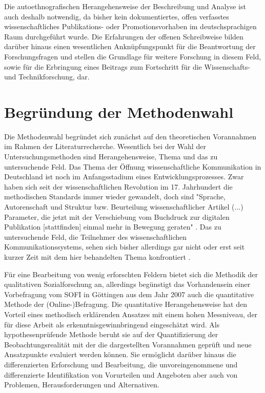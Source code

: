 Die autoethnografischen Herangehensweise der Beschreibung und Analyse ist auch deshalb notwendig, da bisher kein dokumentiertes, offen verfasstes wissenschaftliches Publikations- oder Promotionsvorhaben im deutschsprachigen Raum durchgeführt wurde. Die Erfahrungen der offenen Schreibweise bilden darüber hinaus einen wesentlichen Anknüpfungspunkt für die Beantwortung der Forschungsfragen und stellen die Grundlage für weitere Forschung in diesem Feld, sowie für die Erbringung eines Beitrags zum Fortschritt für die Wissenschafts- und Technikforschung, dar.

\section{Begründung der Methodenwahl}

Die Methodenwahl begründet sich zunächst auf den theoretischen Vorannahmen im Rahmen der Literaturrecherche. Wesentlich bei der Wahl der Untersuchungsmethoden sind Herangehensweise, Thema und das zu untersuchende Feld. Das Thema der Öffnung wissenschaftliche Kommunikation in Deutschland ist noch im Anfangsstadium eines Entwicklungsprozesses. Zwar haben sich seit der wissenschaftlichen Revolution im 17. Jahrhundert die methodischen Standards immer wieder gewandelt, doch sind "Sprache, Autorenschaft und Struktur bzw. Beurteilung wissenschaftlicher Artikel (...) Parameter, die jetzt mit der Verschiebung vom Buchdruck zur digitalen Publikation [stattfinden] einmal mehr in Bewegung geraten" \cite{hagner_2015_sache_buches}. Das zu untersuchende Feld, die Teilnehmer des wissenschaftlichen Kommunikationssystems, sehen sich bisher allerdings gar nicht oder erst seit kurzer Zeit mit dem hier behandelten Thema konfrontiert \cite{hagner_2015_sache_buches}.

Für eine Bearbeitung von wenig erforschten Feldern bietet sich die Methodik der qualitativen Sozialforschung an, allerdings begünstigt das Vorhandensein einer Vorbefragung vom SOFI in Göttingen aus dem Jahr 2007 auch die quantitative Methode der (Online-)Befragung. Die quantitative Herangehensweise hat den Vorteil eines methodisch erklärenden Ansatzes mit einem hohen Messniveau, der für diese Arbeit als erkenntnisgewinnbringend eingeschätzt wird. Als hypothesenprüfende Methode beruht sie auf der Quantifizierung der Beobachtungsrealität \cite{bortz_Doering_2006_Methoden} mit der die dargestellten Vorannahmen geprüft und neue Ansatzpunkte evaluiert werden können. Sie ermöglicht darüber hinaus die differenzierten Erforschung und Bearbeitung, die unvoreingenommene und differenzierte Identifikation von Vorurteilen und Angeboten aber auch von Problemen, Herausforderungen und Alternativen.


